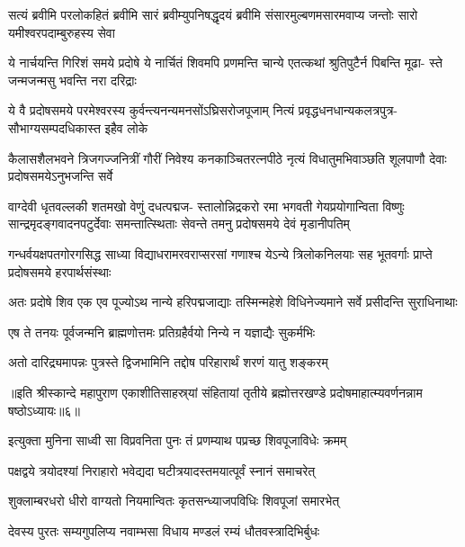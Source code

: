 \begin{center}
\fourlineindentedshloka
{सत्यं ब्रवीमि परलोकहितं ब्रवीमि}
{सारं ब्रवीम्युपनिषद्धृदयं ब्रवीमि}
{संसारमुल्बणमसारमवाप्य जन्तोः}
{सारो यमीश्वरपदाम्बुरुहस्य सेवा} %

\fourlineindentedshloka
{ये नार्चयन्ति गिरिशं समये प्रदोषे}
{ये नार्चितं शिवमपि प्रणमन्ति चान्ये}
{एतत्कथां श्रुतिपुटैर्न पिबन्ति मूढा-}
{स्ते जन्मजन्मसु भवन्ति नरा दरिद्राः} %

\fourlineindentedshloka
{ये वै प्रदोषसमये परमेश्वरस्य}
{कुर्वन्त्यनन्यमनसोंऽघ्रिसरोजपूजाम्}
{नित्यं प्रवृद्धधनधान्यकलत्रपुत्र-}
{सौभाग्यसम्पदधिकास्त इहैव लोके} %

\fourlineindentedshloka
{कैलासशैलभवने त्रिजगज्जनित्रीं}
{गौरीं निवेश्य कनकाञ्चितरत्नपीठे}
{नृत्यं विधातुमभिवाञ्छति शूलपाणौ}
{देवाः प्रदोषसमयेऽनुभजन्ति सर्वे} %

\fourlineindentedshloka
{वाग्देवी धृतवल्लकी शतमखो वेणुं दधत्पद्मज-}
{स्तालोन्निद्रकरो रमा भगवती गेयप्रयोगान्विता}
{विष्णुः सान्द्रमृदङ्गवादनपटुर्देवाः समन्तात्स्थिताः}
{सेवन्ते तमनु प्रदोषसमये देवं मृडानीपतिम्} %

\fourlineindentedshloka
{गन्धर्वयक्षपतगोरगसिद्ध साध्या}
{विद्याधरामरवराप्सरसां गणाश्च}
{येऽन्ये त्रिलोकनिलयाः सह भूतवर्गाः}
{प्राप्ते प्रदोषसमये हरपार्थसंस्थाः} %

\fourlineindentedshloka
{अतः प्रदोषे शिव एक एव}
{पूज्योऽथ नान्ये हरिपद्मजाद्याः}
{तस्मिन्महेशे विधिनेज्यमाने}
{सर्वे प्रसीदन्ति सुराधिनाथाः} %

\twolineshloka
{एष ते तनयः पूर्वजन्मनि ब्राह्मणोत्तमः}
{प्रतिग्रहैर्वयो निन्ये न यज्ञाद्यैः सुकर्मभिः} %

\twolineshloka
{अतो दारिद्र्यमापन्नः पुत्रस्ते द्विजभामिनि}
{तद्दोष परिहारार्थं शरणं यातु शङ्करम्} %

{॥इति श्रीस्कान्दे महापुराण एकाशीतिसाहस्र्यां संहितायां तृतीये ब्रह्मोत्तरखण्डे प्रदोषमाहात्म्यवर्णनन्नाम षष्ठोऽध्यायः॥६॥}


\twolineshloka
{इत्युक्ता मुनिना साध्वी सा विप्रवनिता पुनः}
{तं प्रणम्याथ पप्रच्छ शिवपूजाविधेः क्रमम्} %

\twolineshloka
{पक्षद्वये त्रयोदश्यां निराहारो भवेद्यदा}
{घटीत्रयादस्तमयात्पूर्वं स्नानं समाचरेत्} %

\twolineshloka
{शुक्लाम्बरधरो धीरो वाग्यतो नियमान्वितः}
{कृतसन्ध्याजपविधिः शिवपूजां समारभेत्} %

\twolineshloka
{देवस्य पुरतः सम्यगुपलिप्य नवाम्भसा}
{विधाय मण्डलं रम्यं धौतवस्त्रादिभिर्बुधः} %


\end{center}
